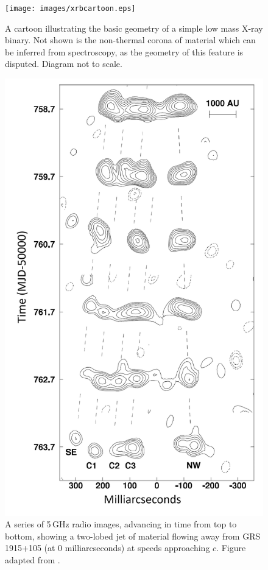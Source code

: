 \begin{figure}
    \texttt{[image: images/xrbcartoon.eps]}
    \captionsetup{singlelinecheck=off}
    \caption[A cartoon illustrating the basic geometry of a simple X-ray binary.]{A cartoon illustrating the basic geometry of a simple low mass X-ray binary.  Not shown is the non-thermal corona of material which can be inferred from spectroscopy, as the geometry of this feature is disputed.  Diagram not to scale.}
   \label{fig:xrbcartoon}
\end{figure}

\begin{figure}
   \centering
    \includegraphics[width=0.6\columnwidth, trim = 0.1mm 0.2mm 0.1mm 0.2mm, clip]{images/contour.png}
    \captionsetup{singlelinecheck=off}
    \caption[A series of 5\,GHz radio images from \citet{Fender_1915} showing a jet being launched from the LMXB GRS 1915+105.]{A series of 5\,GHz radio images, advancing in time from top to bottom, showing a two-lobed jet of material flowing away from GRS 1915+105 (at 0 milliarcseconds) at speeds approaching $c$.  Figure adapted from \citet{Fender_1915}.}
   \label{fig:jet}
\end{figure}

